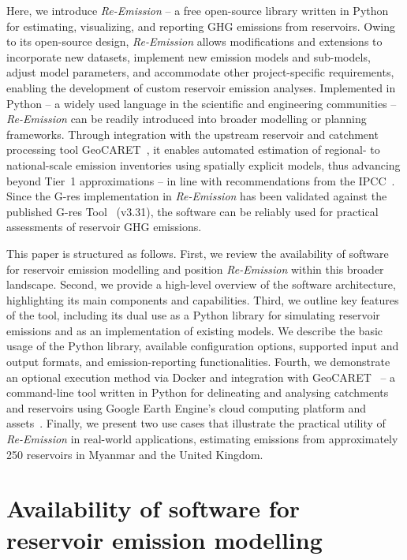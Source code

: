 \documentclass[review, authoryear, 1p]{elsarticle} %
\begin{document}
Here, we introduce \textit{Re-Emission} -- a free open-source library written in Python for estimating, visualizing, and reporting \ac{GHG} emissions from reservoirs. 
Owing to its open-source design, \textit{Re-Emission} allows modifications and extensions to incorporate new datasets, implement new emission models and sub-models, adjust model parameters, and accommodate other project-specific requirements, enabling the development of custom reservoir emission analyses.
Implemented in Python -- a widely used language in the scientific and engineering communities -- \textit{Re-Emission} can be readily introduced into broader modelling or planning frameworks. 
Through integration with the upstream reservoir and catchment processing tool GeoCARET~\citep{heettool}, it enables automated estimation of regional- to national-scale emission inventories using spatially explicit models, thus advancing beyond Tier~1 approximations -- in line with recommendations from the IPCC~\citep{IPCC2019}.
Since the G-res implementation in \textit{Re-Emission} has been validated against the published G-res Tool~\citep{prairie2017gres, Prairie2021} (v3.31), the software can be reliably used for practical assessments of reservoir \ac{GHG} emissions.

This paper is structured as follows.
First, we review the availability of software for reservoir emission modelling and position \textit{Re-Emission} within this broader landscape.
Second, we provide a high-level overview of the software architecture, highlighting its main components and capabilities.
Third, we outline key features of the tool, including its dual use as a Python library for simulating reservoir emissions and as an implementation of existing models. 
We describe the basic usage of the Python library, available configuration options, supported input and output formats, and emission-reporting functionalities.
Fourth, we demonstrate an optional execution method via Docker and integration with GeoCARET~\cite{heettool} -- a command-line tool written in Python for delineating and analysing catchments and reservoirs using Google Earth Engine's cloud computing platform and assets~\cite{Gorelick2017}. 
Finally, we present two use cases that illustrate the practical utility of \textit{Re-Emission} in real-world applications, estimating emissions from approximately 250 reservoirs in Myanmar and the United Kingdom.

\section{Availability of software for reservoir emission modelling}
\label{subsec:software_and_code}
\end{document}
